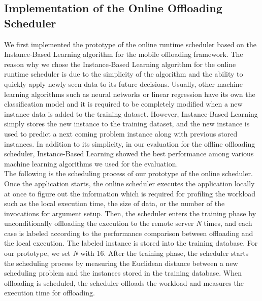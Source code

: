 \documentclass[10pt, conference, compsocconf]{IEEEtran}
\begin{document}
\subsection{Implementation of the Online Offloading Scheduler}
We first implemented the prototype of the online runtime scheduler
based on the Instance-Based Learning algorithm for the mobile offloading
framework.
%
The reason why we chose the Instance-Based Learning algorithm for the
online runtime scheduler is due to the simplicity of the algorithm and
the ability to quickly apply newly seen data to its future decisions.
%
Usually, other machine learning algorithms such as neural networks or
linear regression have its own the classification model and it is
required to be completely modified when a new instance data is added to
the training dataset.
%
%
However, Instance-Based Learning simply stores the new instance to the
training dataset, and the new instance is used to predict a next coming
problem instance along with previous stored instances.
%
In addition to its simplicity, in our evaluation for the offline offloading scheduler,
Instance-Based Learning showed the best performance among various
machine learning algorithms we used for the evaluation.\\
%
\indent The following is the scheduling process of our prototype of the online
scheduler.
%
Once the application starts, the online scheduler executes the
application locally at once to figure out the information which is
required for profiling the workload such as the local execution time, the
size of data, or the number of the invocations for argument setup.
%
Then, the scheduler enters the training phase by unconditionally
offloading the execution to the remote server \textit{N} times, and
each case is labeled according to the performance comparison between
offloading and the local execution.
%
The labeled instance is stored into the training database.
%
For our prototype, we set \textit{N} with 16.
%
After the training phase, the scheduler starts the scheduling process by
measuring the Euclidean distance between a new scheduling problem and
the instances stored in the training database.
%
When offloading is scheduled, the scheduler offloads the workload and 
measures the execution time for offloading.
\end{document}
